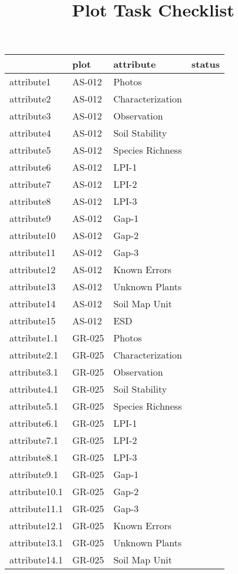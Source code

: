 \documentclass[
]{article}
\title{Plot Task Checklist}
\author{}
\date{\vspace{-2.5em}}
\begin{document}
\maketitle

\begin{longtable}[]{@{}llll@{}}
\toprule
& plot & attribute & status \\
\midrule
\endhead
attribute1 & AS-012 & Photos & \\
attribute2 & AS-012 & Characterization & \\
attribute3 & AS-012 & Observation & \\
attribute4 & AS-012 & Soil Stability & \\
attribute5 & AS-012 & Species Richness & \\
attribute6 & AS-012 & LPI-1 & \\
attribute7 & AS-012 & LPI-2 & \\
attribute8 & AS-012 & LPI-3 & \\
attribute9 & AS-012 & Gap-1 & \\
attribute10 & AS-012 & Gap-2 & \\
attribute11 & AS-012 & Gap-3 & \\
attribute12 & AS-012 & Known Errors & \\
attribute13 & AS-012 & Unknown Plants & \\
attribute14 & AS-012 & Soil Map Unit & \\
attribute15 & AS-012 & ESD & \\
attribute1.1 & GR-025 & Photos & \\
attribute2.1 & GR-025 & Characterization & \\
attribute3.1 & GR-025 & Observation & \\
attribute4.1 & GR-025 & Soil Stability & \\
attribute5.1 & GR-025 & Species Richness & \\
attribute6.1 & GR-025 & LPI-1 & \\
attribute7.1 & GR-025 & LPI-2 & \\
attribute8.1 & GR-025 & LPI-3 & \\
attribute9.1 & GR-025 & Gap-1 & \\
attribute10.1 & GR-025 & Gap-2 & \\
attribute11.1 & GR-025 & Gap-3 & \\
attribute12.1 & GR-025 & Known Errors & \\
attribute13.1 & GR-025 & Unknown Plants & \\
attribute14.1 & GR-025 & Soil Map Unit & \\

\end{longtable}
\end{document}

